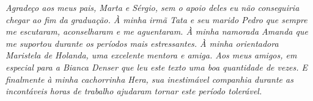 \emph{Agradeço aos meus pais, Marta e Sérgio, sem o apoio deles eu não conseguiria chegar ao fim da graduação.
À minha irmã Tata e seu marido Pedro que sempre me escutaram, aconselharam e me aguentaram.
À minha namorada Amanda que me suportou durante os períodos mais estressantes.
À minha orientadora \prof[a] \dr[a] Maristela de Holanda, uma excelente mentora e amiga.
Aos meus amigos, em especial para a Bianca Denser que leu este texto uma boa quantidade de vezes.
E finalmente à minha cachorrinha Hera, sua inestimável companhia durante as incontáveis horas de trabalho
ajudaram tornar este período tolerável.}
